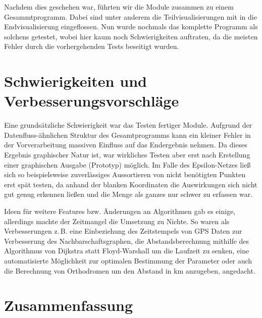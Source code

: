 \documentclass[parskip=half,
 fontsize=12pt, bibtotoc,
 ngerman]
 {article}
\begin{document}
Nachdem dies geschehen war, führten wir die Module zusammen zu einem Gesammtprogramm. Dabei sind unter anderem die Teilvisualisierungen mit in die Endvisualisierung eingeflossen. Nun wurde nochmals das komplette Programm als solchens getestet, wobei hier kaum noch Schwierigkeiten auftraten, da die meisten Fehler durch die vorhergehenden Tests beseitigt wurden.

\section{Schwierigkeiten und Verbesserungsvorschläge}

Eine grundsätzliche Schwierigkeit war das Testen fertiger Module.
Aufgrund der Datenfluss-ähnlichen Struktur des Gesamtprogramms kann
ein kleiner Fehler in der Vorverarbeitung massiven Einfluss
auf das Endergebnis nehmen. Da dieses Ergebnis graphischer Natur ist,
war wirkliches Testen aber erst nach Erstellung einer graphischen Ausgabe
(Prototyp) möglich. Im Falle des Epsilon-Netzes ließ sich so beispielsweise 
zuverlässiges Aussortieren von nicht benötigten Punkten erst spät testen,
da anhand der blanken Koordinaten die Auswirkungen sich nicht gut genug
erkennen ließen und die Menge als ganzes nur schwer zu erfassen war.

Ideen für weitere Features bzw. Änderungen an Algorithmen gab es einige, 
allerdings machte der Zeitmangel die Umsetzung zu Nichte. So waren
als Verbesserungen z.\,B. eine Einbeziehung des Zeitstempels von GPS Daten
zur Verbesserung des Nachbarschaftsgraphen, die Abstandsberechnung mithilfe des
Algorithmus von Dijkstra statt Floyd-Warshall um die Laufzeit zu senken,
eine automatisierte Möglichkeit zur optimalen Bestimmung der Parameter oder
auch die Berechnung von Orthodromen um den Abstand in km anzugeben, angedacht.

\section{Zusammenfassung}
\printbibliography
\end{document}
